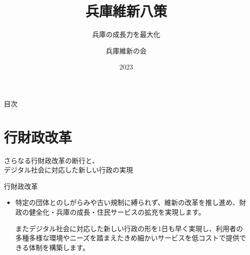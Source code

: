 \documentclass[dvipdfmx]{beamer}
\title{兵庫維新八策}
\subtitle{兵庫の成長力を最大化}
\author{兵庫維新の会}
\date{2023}
\begin{document}
\maketitle

\begin{frame}{目次}
    \tableofcontents
\end{frame}

\section{行財政改革}
    \begin{frame}{}{}
        \sectionpage
        \begin{center}
            \begin{large}
                \alert{さらなる行財政改革の断行と、}\\\alert{デジタル社会に対応した新しい行政の実現}
            \end{large}
        \end{center}
    \end{frame}

    \begin{frame}{行財政改革}{}
        \begin{small}
            \begin{itemize}
                \setlength{\parsep}{.5mm}
                \setlength{\itemsep}{2mm}
                \item 特定の団体とのしがらみや古い規制に縛られず、維新の改革を推し進め、財政の健全化・兵庫の成長・住民サービスの拡充を実現します。\par
                またデジタル社会に対応した新しい行政の形を1日も早く実現し、利用者の多種多様な環境やニーズを踏まえたきめ細かいサービスを低コストで提供できる体制を構築します。
            \end{itemize}
        \end{small}
    \end{frame}
\end{document}
